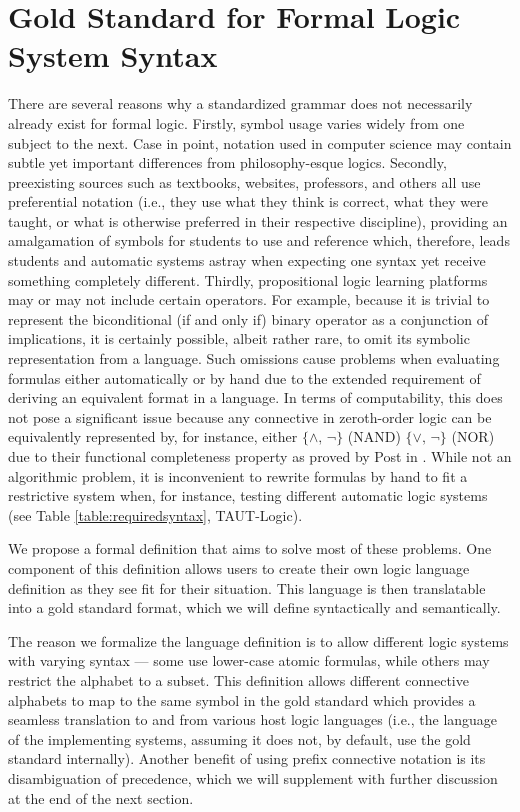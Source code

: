 \documentclass[ms]{uncgdissertationexp2}
\theoremstyle{plain}
\theoremstyle{definition}
\theoremstyle{remark}
\begin{document}
\section{Gold Standard for Formal Logic System Syntax}
There are several reasons why a standardized grammar does not necessarily already exist for formal logic. Firstly, symbol usage varies widely from one subject to the next. Case in point, notation used in computer science may contain subtle yet important differences from philosophy-esque logics. Secondly, preexisting sources such as textbooks, websites, professors, and others all use preferential notation (i.e., they use what they think is correct, what they were taught, or what is otherwise preferred in their respective discipline), providing an amalgamation of symbols for students to use and reference which, therefore, leads students and automatic systems astray when expecting one syntax yet receive something completely different. Thirdly, propositional logic learning platforms may or may not include certain operators. For example, because it is trivial to represent the biconditional (if and only if) binary operator as a conjunction of implications, it is certainly possible, albeit rather rare, to omit its symbolic representation from a language. Such omissions cause problems when evaluating formulas either automatically or by hand due to the extended requirement of deriving an equivalent format in a language. In terms of computability, this does not pose a significant issue because any connective in zeroth-order logic can be equivalently represented by, for instance, either $\{\land,\,\lnot\}$ (NAND) $\{\lor,\,\lnot\}$ (NOR) due to their functional completeness property as proved by Post in \cite{post}. While not an algorithmic problem, it is inconvenient to rewrite formulas by hand to fit a restrictive system when, for instance, testing different automatic logic systems (see Table \ref{table:requiredsyntax}, TAUT-Logic).

We propose a formal definition that aims to solve most of these problems. One component of this definition allows users to create their own logic language definition as they see fit for their situation. This language is then translatable into a gold standard format, which we will define syntactically and semantically.

The reason we formalize the language definition is to allow different logic systems with varying syntax --- some use lower-case atomic formulas, while others may restrict the alphabet to a subset. This definition allows different connective alphabets to map to the same symbol in the gold standard which provides a seamless translation to and from various host logic languages (i.e., the language of the implementing systems, assuming it does not, by default, use the gold standard internally). Another benefit of using prefix connective notation is its disambiguation of precedence, which we will supplement with further discussion at the end of the next section.
\end{document}
